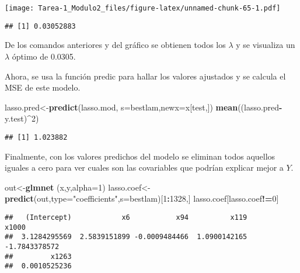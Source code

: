 \documentclass[
]{article}
\newenvironment{Shaded}{\begin{snugshade}}{\end{snugshade}}
\newcommand{\DataTypeTok}[1]{\textcolor[rgb]{0.13,0.29,0.53}{#1}}
\newcommand{\DecValTok}[1]{\textcolor[rgb]{0.00,0.00,0.81}{#1}}
\newcommand{\KeywordTok}[1]{\textcolor[rgb]{0.13,0.29,0.53}{\textbf{#1}}}
\newcommand{\NormalTok}[1]{#1}
\newcommand{\OperatorTok}[1]{\textcolor[rgb]{0.81,0.36,0.00}{\textbf{#1}}}
\newcommand{\StringTok}[1]{\textcolor[rgb]{0.31,0.60,0.02}{#1}}
\begin{document}
\texttt{[image: Tarea-1\_Modulo2\_files/figure-latex/unnamed-chunk-65-1.pdf]}

\begin{Shaded}
\end{Shaded}

\begin{verbatim}
## [1] 0.03052883
\end{verbatim}

De los comandos anteriores y del gráfico se obtienen todos los
\(\lambda\) y se visualiza un \(\lambda\) óptimo de 0.0305.

Ahora, se usa la función predic para hallar los valores ajustados y se
calcula el MSE de este modelo.

\begin{Shaded}
\begin{Highlighting}[]
\NormalTok{lasso.pred<-}\KeywordTok{predict}\NormalTok{(lasso.mod, }\DataTypeTok{s=}\NormalTok{bestlam,}\DataTypeTok{newx=}\NormalTok{x[test,])}
\KeywordTok{mean}\NormalTok{((lasso.pred}\OperatorTok{-}\NormalTok{y.test)}\OperatorTok{^}\DecValTok{2}\NormalTok{)}
\end{Highlighting}
\end{Shaded}

\begin{verbatim}
## [1] 1.023882
\end{verbatim}

Finalmente, con los valores predichos del modelo se eliminan todos
aquellos iguales a cero para ver cuales son las covariables que podrían
explicar mejor a \(Y\).

\begin{Shaded}
\begin{Highlighting}[]
\NormalTok{out<-}\KeywordTok{glmnet}\NormalTok{ (x,y,}\DataTypeTok{alpha=}\DecValTok{1}\NormalTok{)}
\NormalTok{lasso.coef<-}\KeywordTok{predict}\NormalTok{(out,}\DataTypeTok{type=}\StringTok{"coefficients"}\NormalTok{,}\DataTypeTok{s=}\NormalTok{bestlam)[}\DecValTok{1}\OperatorTok{:}\DecValTok{1328}\NormalTok{,]}
\NormalTok{lasso.coef[lasso.coef}\OperatorTok{!=}\DecValTok{0}\NormalTok{]}
\end{Highlighting}
\end{Shaded}

\begin{verbatim}
##   (Intercept)            x6           x94          x119         x1000 
##  3.1284295569  2.5839151899 -0.0009484466  1.0900142165 -1.7843378572 
##         x1263 
##  0.0010525236
\end{verbatim}
\end{document}
